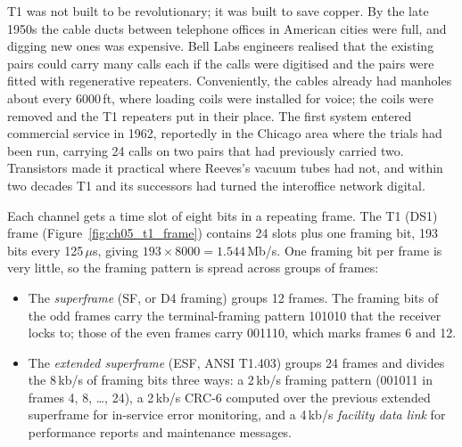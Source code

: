 \begin{history}
T1 was not built to be revolutionary; it was built to save copper. By the late 1950s the cable
ducts between telephone offices in American cities were full, and digging new ones was expensive.
Bell Labs engineers realised that the existing pairs could carry many calls each if the calls were
digitised and the pairs were fitted with regenerative repeaters. Conveniently, the cables already
had manholes about every 6000\,ft, where loading coils were installed for voice; the coils were
removed and the T1 repeaters put in their place. The first system entered commercial service in
1962, reportedly in the Chicago area where the trials had been run, carrying 24 calls on two pairs that had previously carried two. Transistors
made it practical where Reeves's vacuum tubes had not, and within two decades T1 and its successors
had turned the interoffice network digital.
\end{history}



Each channel gets a time slot of eight bits in a repeating frame. The T1 (DS1) frame
(Figure~\ref{fig:ch05_t1_frame}) contains 24 slots plus one framing bit, 193 bits every 125\,$\mu$s,
giving $193\times8000=1.544$\,Mb/s. One framing bit per frame is very little, so the framing pattern
is spread across groups of frames:
\begin{itemize}
\item The \emph{superframe} (SF, or D4 framing) groups 12 frames. The framing bits of the odd
frames carry the terminal-framing pattern 101010 that the receiver locks to; those of the even
frames carry 001110, which marks frames 6 and 12.
\item The \emph{extended superframe} (ESF, ANSI T1.403) groups 24 frames and divides the
8\,kb/s of framing bits three ways: a 2\,kb/s framing pattern (001011 in frames 4, 8, \dots, 24),
a 2\,kb/s CRC-6 computed over the previous extended superframe for in-service error monitoring,
and a 4\,kb/s \emph{facility data link} for performance reports and maintenance messages.
\end{itemize}


